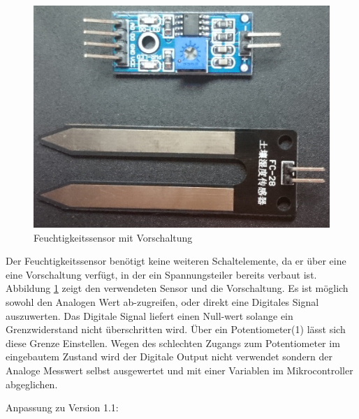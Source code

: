 \documentclass[]{IEEEtran}
\begin{document}
\begin{figure}
	\centering
	\includegraphics[width=0.8\linewidth]{bilder/_feuchteSensor1.jpg}
	\caption{Feuchtigkeitssensor mit Vorschaltung}
	\label{fig-SensorVorschaltung}
\end{figure}
Der Feuchtigkeitssensor benötigt keine weiteren Schaltelemente, da er über eine eine Vorschaltung verfügt, in der ein Spannungsteiler bereits verbaut ist. 
Abbildung \ref{fig-SensorVorschaltung} zeigt den verwendeten Sensor und die Vorschaltung. 
Es ist möglich sowohl den Analogen Wert ab-zugreifen, oder direkt eine Digitales Signal auszuwerten. Das Digitale Signal liefert einen Null-wert solange ein Grenzwiderstand nicht überschritten wird. Über ein  Potentiometer(1) lässt sich diese Grenze Einstellen. Wegen des schlechten Zugangs zum Potentiometer im eingebautem Zustand wird der Digitale Output nicht verwendet sondern der Analoge Messwert selbst ausgewertet und mit einer Variablen im Mikrocontroller abgeglichen.
		
Anpassung zu Version 1.1:
 
\end{document}
